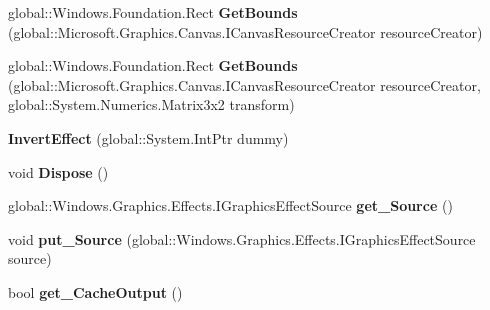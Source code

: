 \begin{DoxyCompactItemize}
global\+::\+Windows.\+Foundation.\+Rect {\bfseries Get\+Bounds} (global\+::\+Microsoft.\+Graphics.\+Canvas.\+I\+Canvas\+Resource\+Creator resource\+Creator)
\item 
\mbox{\label{class_microsoft_1_1_graphics_1_1_canvas_1_1_effects_1_1_invert_effect_a74ffdb0e709635a8916e51a009e69928}} 
global\+::\+Windows.\+Foundation.\+Rect {\bfseries Get\+Bounds} (global\+::\+Microsoft.\+Graphics.\+Canvas.\+I\+Canvas\+Resource\+Creator resource\+Creator, global\+::\+System.\+Numerics.\+Matrix3x2 transform)
\item 
\mbox{\label{class_microsoft_1_1_graphics_1_1_canvas_1_1_effects_1_1_invert_effect_a22f313595335226f5fa4bd22ccbe50de}} 
{\bfseries Invert\+Effect} (global\+::\+System.\+Int\+Ptr dummy)
\item 
\mbox{\label{class_microsoft_1_1_graphics_1_1_canvas_1_1_effects_1_1_invert_effect_a4cbb66c8027cb5045b12c5081e5c3595}} 
void {\bfseries Dispose} ()
\item 
\mbox{\label{class_microsoft_1_1_graphics_1_1_canvas_1_1_effects_1_1_invert_effect_a1a48c5114100636a70cd61f22db40b37}} 
global\+::\+Windows.\+Graphics.\+Effects.\+I\+Graphics\+Effect\+Source {\bfseries get\+\_\+\+Source} ()
\item 
\mbox{\label{class_microsoft_1_1_graphics_1_1_canvas_1_1_effects_1_1_invert_effect_aba1a182ec0dbb283e58826cd8e09df24}} 
void {\bfseries put\+\_\+\+Source} (global\+::\+Windows.\+Graphics.\+Effects.\+I\+Graphics\+Effect\+Source source)
\item 
\mbox{\label{class_microsoft_1_1_graphics_1_1_canvas_1_1_effects_1_1_invert_effect_a155e7cd471179469832809c7098760de}} 
bool {\bfseries get\+\_\+\+Cache\+Output} ()
\item 
\mbox{\label{class_microsoft_1_1_graphics_1_1_canvas_1_1_effects_1_1_invert_effect_a8b575bd07a563722ae459058581e5b2a}} 

\end{DoxyCompactItemize}
